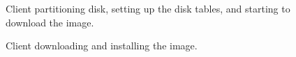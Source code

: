 \begin{figure}[!ht]
  \begin{center}
    \centerline{
      }
    \caption{Client partitioning disk, setting up the disk tables, and
      starting to download the image.}
    \label{fig:sbs-install-diskpar}
  \end{center}
\end{figure}
  
\begin{figure}[!ht]
  \begin{center}
    \centerline{
      }
    \caption{Client downloading and installing the image.}
    \label{fig:sbs-install-rsync}
  \end{center}
\end{figure}

